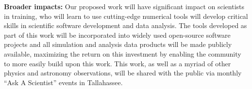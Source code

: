 \documentclass[11pt]{article}
\begin{document}
\textbf{Broader impacts:} 
Our proposed work will have significant impact on scientists in training, who will learn to use cutting-edge numerical tools will develop critical skills in scientific software development and data analysis.  The tools developed as part of this work will be incorporated into widely used open-source software projects and all simulation and analysis data products will be made publicly available, maximizing the return on this investment by enabling the community to more easily build upon this work.  This work, as well as a myriad of other physics and astronomy observations, will be shared with the public via monthly ``Ask A Scientist'' events in Tallahassee.
\end{document}
